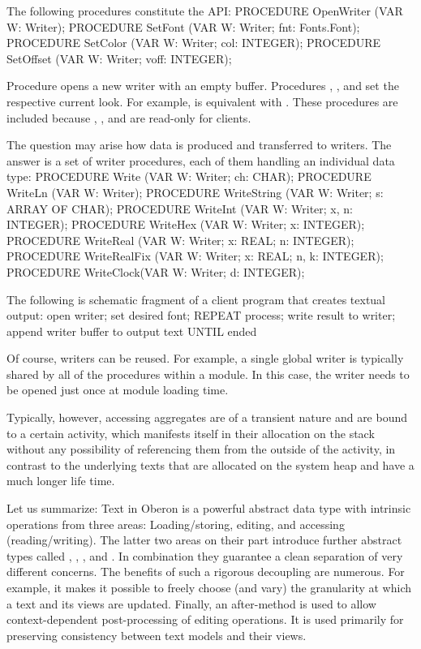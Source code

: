 The following procedures constitute the  API:
\begintt
PROCEDURE OpenWriter (VAR W: Writer);
PROCEDURE SetFont (VAR W: Writer; fnt: Fonts.Font);
PROCEDURE SetColor (VAR W: Writer; col: INTEGER);
PROCEDURE SetOffset (VAR W: Writer; voff: INTEGER);
\endtt

\noindent Procedure  opens a new writer with an empty buffer. Procedures , , and  set the respective current look. For example,
 is equivalent with .
These procedures are included because , , and  are read-only for clients.

The question may arise how data is produced and transferred to
writers. The answer is a set of writer procedures, each of them
handling an individual data type:
\begintt
PROCEDURE Write (VAR W: Writer; ch: CHAR);
PROCEDURE WriteLn (VAR W: Writer);
PROCEDURE WriteString (VAR W: Writer; s: ARRAY OF CHAR);
PROCEDURE WriteInt (VAR W: Writer; x, n: INTEGER);
PROCEDURE WriteHex (VAR W: Writer; x: INTEGER);
PROCEDURE WriteReal (VAR W: Writer; x: REAL; n: INTEGER);
PROCEDURE WriteRealFix (VAR W: Writer; x: REAL; n, k: INTEGER);
PROCEDURE WriteClock(VAR W: Writer; d: INTEGER);
\endtt

\noindent The following is schematic fragment of a client program that creates textual output:
\begintt
open writer; set desired font;
REPEAT
  process;
  write result to writer;
  append writer buffer to output text
UNTIL ended
\endtt

\noindent Of course, writers can be reused. For example, a single global writer
is typically shared by all of the procedures within a module. In this
case, the writer needs to be opened just once at module loading time.

Typically, however, accessing aggregates are of a transient nature and
are bound to a certain activity, which manifests itself in their
allocation on the stack without any possibility of referencing them
from the outside of the activity, in contrast to the underlying texts
that are allocated on the system heap and have a much longer life
time.

Let us summarize: Text in Oberon is a powerful abstract data type with
intrinsic operations from three areas: Loading/storing, editing, and
accessing (reading/writing). The latter two areas on their part
introduce further abstract types called , , , and
. In combination they guarantee a clean separation of very
different concerns. The benefits of such a rigorous decoupling are
numerous. For example, it makes it possible to freely choose (and
vary) the granularity at which a text and its views are
updated. Finally, an after-method is used to allow context-dependent
post-processing of editing operations. It is used primarily for
preserving consistency between text models and their views.

